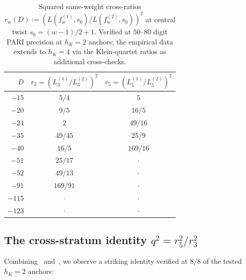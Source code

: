 \begin{table}[h!]
\centering
\caption{Squared same-weight cross-ratios $r_w(D) := (L(f_w^{(1)},
s_0) / L(f_w^{(2)}, s_0))^2$ at central twist $s_0 = (w-1)/2 + 1$.
Verified at $50$--$80$ digit PARI precision at $h_K = 2$ anchors;
the empirical data extends to $h_K = 4$ via the Klein-quartet
ratios as additional cross-checks.}
\label{tab:same-weight-full}
\begin{tabular}{rcc}
\toprule
$D$    & $r_3 = (L_3^{(1)}/L_3^{(2)})^2$  & $r_5 = (L_5^{(1)}/L_5^{(2)})^2$ \\
\midrule
$-15$  & $5/4$          & $5$ \\
$-20$  & $9/5$          & $16/5$ \\
$-24$  & $2$            & $49/16$ \\
$-35$  & $49/45$        & $25/9$ \\
$-40$  & $16/5$         & $169/16$ \\
$-51$  & $25/17$        & $\cdot$ \\
$-52$  & $49/13$        & $\cdot$ \\
$-91$  & $169/91$       & $\cdot$ \\
$-115$ & $\cdot$        & $\cdot$ \\
$-123$ & $\cdot$        & $\cdot$ \\
\bottomrule
\end{tabular}
\end{table}

\subsection{The cross-stratum identity $q^2 = r_5^2 / r_3^2$}
\label{ss:identity-empirical}

Combining~ and~,
we observe a striking identity verified at $8/8$ of the tested
$h_K = 2$ anchors:

